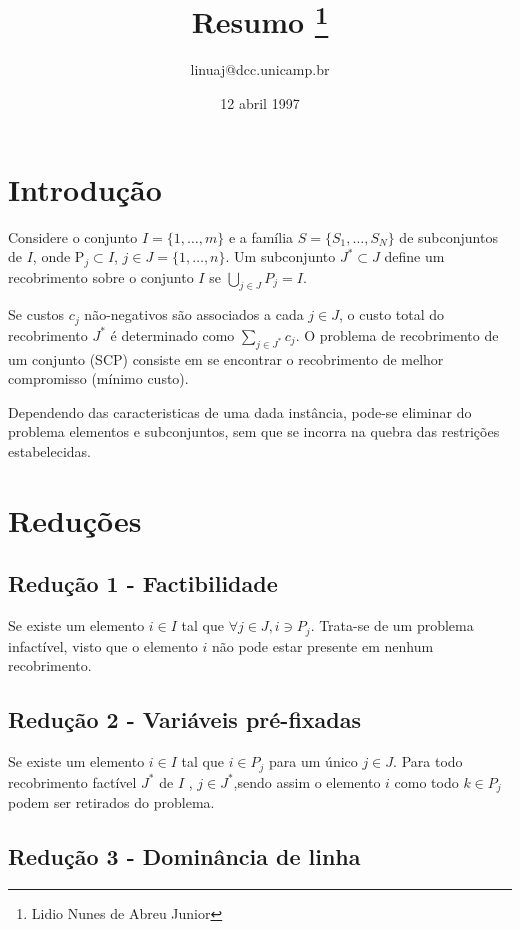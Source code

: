\documentclass[a4paper,10pt]{article}
\title{ Resumo \footnote{Lidio Nunes de Abreu Junior}}
\author{ linuaj@dcc.unicamp.br}
\date{12 abril 1997}
\begin{document}
\maketitle


\section{Introdução}

Considere o conjunto $I= \{1,\dots,m \}$ e a família $S=\{ S_{1},\dots,S_{N} \}$ de subconjuntos de $I$, onde P$_{j}\subset I$, $j \in J= \{1,\dots,n \}$. Um subconjunto $J^{*}\subset J$ define um recobrimento sobre o conjunto $I$ se $\bigcup _{j \in J} P_{j}=I$.

Se custos $c_{j}$ não-negativos são associados a cada $j \in J$, o custo total do recobrimento $J^{*}$ é determinado como $ \sum _{j \in J^{*}} c_{j}$. O problema de recobrimento de um conjunto (SCP) consiste em se encontrar o recobrimento de melhor compromisso (mínimo custo).

Dependendo das caracteristicas de uma dada instância, pode-se eliminar do problema elementos e subconjuntos, sem que se incorra na quebra das restrições estabelecidas.

\section{Reduções}

\subsection{Redução 1 - Factibilidade}

Se existe um elemento $i \in I$ tal que $ \forall j \in J , i \ni  P_{j}$. Trata-se de um problema infactível, visto que o elemento $i$ não pode estar presente em nenhum recobrimento. 

\subsection{Redução 2 - Variáveis pré-fixadas}

Se existe um elemento $i \in I$ tal que $i \in P_{j}$ para um único $j \in J$. Para todo recobrimento factível $J^{*}$ de $I$ , $j \in J^{*}$,sendo assim o elemento $i$ como todo $k \in P_{j}$ podem ser retirados do problema.

\subsection{Redução 3 - Dominância de linha}
\end{document}
